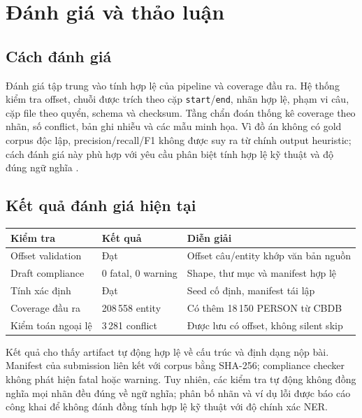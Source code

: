 \documentclass[11pt,a4paper]{article}
\begin{document}
\section{Đánh giá và thảo luận}

\subsection{Cách đánh giá}

Đánh giá tập trung vào tính hợp lệ của pipeline và coverage đầu ra. Hệ thống
kiểm tra offset, chuỗi được trích theo cặp \texttt{start}/\texttt{end}, nhãn
hợp lệ, phạm vi câu, cặp file theo quyển, schema và checksum. Tầng chẩn đoán
thống kê coverage theo nhãn, số conflict, bản ghi nhiễu và các mẫu minh họa.
Vì đồ án không có gold corpus độc lập, precision/recall/F1 không được suy ra từ
chính output heuristic; cách đánh giá này phù hợp với yêu cầu phân biệt tính hợp
lệ kỹ thuật và độ đúng ngữ nghĩa \cite{guner2023}.

\subsection{Kết quả đánh giá hiện tại}

\begin{table}[ht]
\centering
\small
\begin{tabularx}{\textwidth}{X l X}
\toprule
Kiểm tra & Kết quả & Diễn giải \\
\midrule
Offset validation & Đạt & Offset câu/entity khớp văn bản nguồn \\
Draft compliance & 0 fatal, 0 warning & Shape, thư mục và manifest hợp lệ \\
Tính xác định & Đạt & Seed cố định, manifest tái lập \\
Coverage đầu ra & 208\,558 entity & Có thêm 18\,150 PERSON từ CBDB \\
Kiểm toán ngoại lệ & 3\,281 conflict & Được lưu có offset, không silent skip \\
\bottomrule
\end{tabularx}
\end{table}

Kết quả cho thấy artifact tự động hợp lệ về cấu trúc và định dạng nộp bài.
Manifest của submission liên kết với corpus bằng SHA-256; compliance checker
không phát hiện fatal hoặc warning. Tuy nhiên, các kiểm tra tự động không
đồng nghĩa mọi nhãn đều đúng về ngữ nghĩa; phân bố nhãn và ví dụ lỗi được báo
cáo công khai để không đánh đồng tính hợp lệ kỹ thuật với độ chính xác NER.
\end{document}
